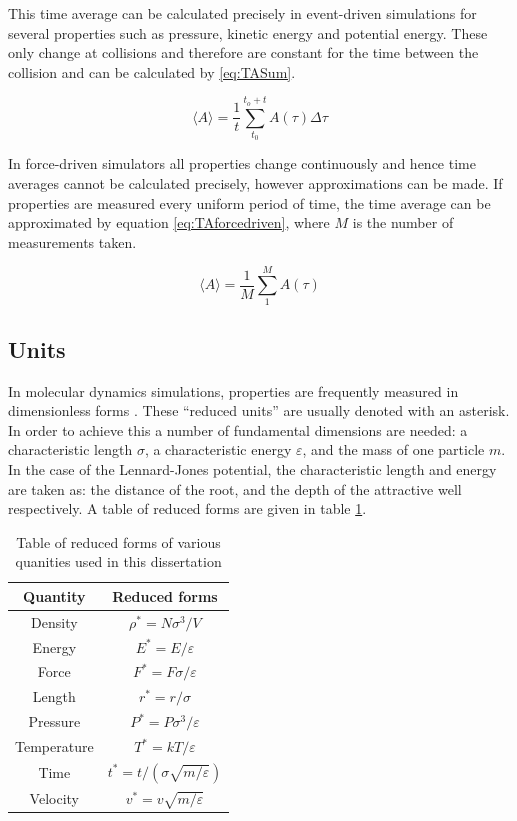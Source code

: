 \documentclass[12pt]{UoAthesis}
\begin{document}
This time average can be calculated precisely in event-driven
simulations for several properties such as pressure, kinetic energy
and potential energy.  These only change at collisions and therefore
are constant for the time between the collision and can be calculated
by \eqref{eq:TASum}.

\begin{equation}
  \label{eq:TASum}
  \langle A \rangle = \frac{1}{t}\sum^{t_o+t}_{t_0}A(\tau)\Delta \tau
\end{equation}

In force-driven simulators all properties change continuously and
hence time averages cannot be calculated precisely, however
approximations can be made. If properties are measured every uniform
period of time, the time average can be approximated by equation
\eqref{eq:TAforcedriven}, where $M$ is the number of measurements
taken.

\begin{equation}
  \label{eq:TAforcedriven}
  \langle A \rangle = \frac{1}{M} \sum^{M}_{1}A(\tau)
\end{equation}
\subsection{Units}

In molecular dynamics simulations, properties are frequently measured
in dimensionless forms \cite{Haile1997}. These ``reduced units'' are
usually denoted with an asterisk.  In order to achieve this a number
of fundamental dimensions are needed: a characteristic length $\sigma$, a
characteristic energy $\varepsilon$, and the mass of one particle $m$.  In the case of
the Lennard-Jones potential, the characteristic length and energy are
taken as: the distance of the root, and the depth of the attractive
well respectively. A table of reduced forms are given in table
\ref{tab:reducedForms}.

\begin{table}[htp] 
  \caption{Table of reduced forms of various quanities used in this
    dissertation \cite{Haile1997}}
  \label{tab:reducedForms}
  \begin{center}
    \begin{tabular}{c c}
      \toprule
      Quantity & Reduced forms \\
      \midrule
      Density & $\rho^* = N \sigma^3 / V$ \\
      Energy & $E^* = E / \varepsilon$ \\
      Force & $F^* = F\sigma/\varepsilon$ \\
      Length & $r^* = r / \sigma$ \\
      Pressure & $P^* = P \sigma^3 /\varepsilon$ \\
      Temperature & $T^* = kT/\varepsilon$ \\
      Time & $t^* = t / (\sigma \sqrt{m/\varepsilon})$ \\
      Velocity & $v^* = v\sqrt{m/\varepsilon}$ \\
      \bottomrule
    \end{tabular}
  \end{center}
\end{table}
\end{document}
